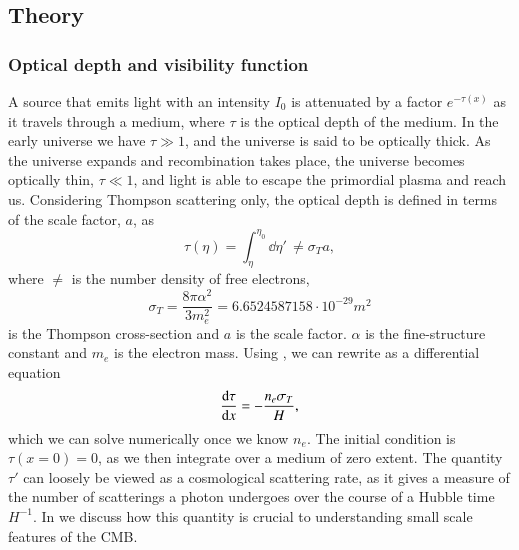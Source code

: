 

\subsection{Theory}\label{ssec:M2:theory}

\subsubsection{Optical depth and visibility function} \label{sssec:M2:optical_depth_and_visibility_function}

A source that emits light with an intensity $I_0$ is attenuated by a factor $e^{-\tau(x)}$ as it travels through a medium, where $\tau$ is the optical depth of the medium. In the early universe we have $\tau\gg1$, and the universe is said to be optically thick. As the universe expands and recombination takes place, the universe becomes optically thin, $\tau\ll1$, and light is able to escape the primordial plasma and reach us. Considering Thompson scattering only, the optical depth is defined in terms of the scale factor, $a$, as \citep[Eq. (5)]{callin} 
\begin{equation} \label{eq:M2:theory:optical_depth_integral_definition}
    \tau(\eta) = \int_\eta^{\eta_0} \dd \eta' \,\ne \sigma_T a,
\end{equation}
where $\ne$ is the number density of free electrons,
\begin{equation} \label{eq:M2:theory:thomspon_cross_section}
    \sigma_T=\frac{8\pi\alpha^2}{3 m_e^2} = 6.6524587158\cdot 10^{-29}\unit{m^2} 
\end{equation}
is the Thompson cross-section and $a$ is the scale factor. $\alpha$ is the fine-structure constant and $m_e$ is the electron mass. Using , we can rewrite  as a differential equation 
\begin{equation} \label{eq:M2:theory:tau_ODE}
    \dv{\tau}{x} = - \frac{n_e \sigma_T}{H},
\end{equation}
which we can solve numerically once we know $n_e$. The initial condition is $\tau(x=0)=0$, as we then integrate over a medium of zero extent. The quantity $\tau'$ can loosely be viewed as a cosmological scattering rate, as it gives a measure of the number of scatterings a photon undergoes over the course of a Hubble time $H^{-1}$. In  we discuss how this quantity is crucial to understanding small scale features of the CMB.   

